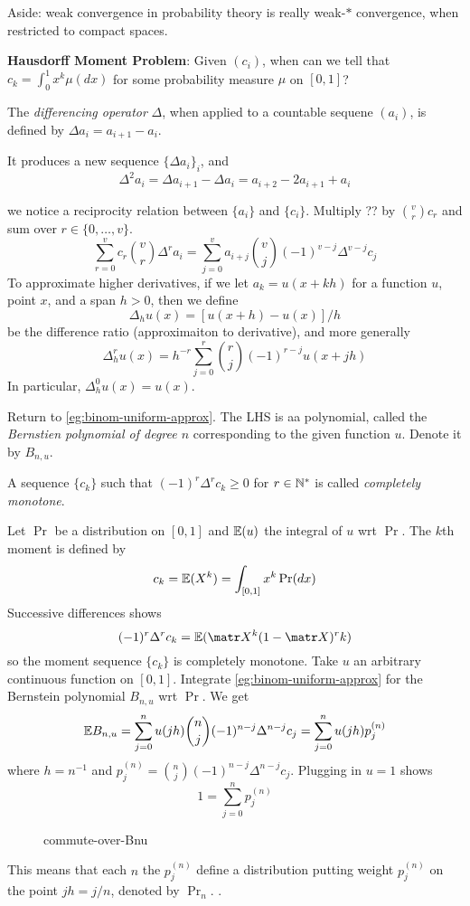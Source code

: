 Aside: weak convergence in probability theory is really weak-$\ast$ convergence,
when restricted to compact spaces.

\textbf{Hausdorff Moment Problem}: Given $(c_i)$, when can we tell that
$c_k = \int_0^1 x^k \mu(dx)$ for some probability measure $\mu$
on $[0,1]$?

\begin{definition}
  The \emph{differencing operator} $\Delta$, when applied to a countable
  sequene $(a_i)$, is defined by $\Delta a_i = a_{i+1} - a_i$.
\end{definition}

It produces a new sequence $\{\Delta a_i\}_i$, and
\[
  \Delta^2 a_i = \Delta a_{i+1} - \Delta a_i
  = a_{i+2} - 2 a_{i+1} + a_i
\]

we notice a reciprocity relation between $\{a_i\}$ and $\{c_i\}$.
Multiply ?? by $\binom{v}{r} c_r$ and sum over $r \in \{0,\ldots,v\}$.
\[
  \sum_{r=0}^v c_r \binom{v}{r} \Delta^r a_i
  = \sum_{j=0}^v a_{i+j} \binom{v}{j} (-1)^{v-j} \Delta^{v-j} c_j
\]
To approximate higher derivatives,
if we let $a_k = u(x+kh)$ for a function $u$, point $x$, and a span $h > 0$,
then we define
\[
  \Delta_h u(x) = [u(x+h) - u(x)] / h
\]
be the difference ratio (approximaiton to derivative), and more generally
\[
  \Delta_h^r u(x) = h^{-r} \sum_{j=0}^r \binom{r}{j} (-1)^{r-j} u(x+jh)
\]
In particular, $\Delta_h^0 u(x) = u(x)$.

Return to \cref{eg:binom-uniform-approx}. The LHS is aa polynomial,
called the \emph{Bernstien polynomial of degree $n$} corresponding
to the given function $u$.
Denote it by $B_{n,u}$.


\begin{definition}
  A sequence $\{c_k\}$ such that $(-1)^r \Delta^r c_k \geq 0$
  for $r \in \mathbb{N}^*$
  is called \emph{completely monotone}.
\end{definition}

Let $\Pr$ be a distribution on $[0,1]$ and $\mathbb{E}(u)$ the
integral of $u$ wrt $\Pr$.  The $k$th moment is defined by
\[
  c_k = \mathbb{E}(X^k) = \int_{[0,1]} x^k \Pr(dx)
\]
Successive differences shows
\[
  (-1)^r \Delta^r c_k = \bE(\mX^k (1 - \mX)^rk)
\]
so the moment sequence $\{c_k\}$ is completely monotone.
Take $u$ an arbitrary continuous function on $[0,1]$.
Integrate \cref{eg:binom-uniform-approx}  for
the Bernstein polynomial $B_{n,u}$ wrt $\Pr$. We get
\[
  \mathbb{E} B_{n,u}
  = \sum_{j=0}^n u(jh) \binom{n}{j} (-1)^{n-j} \Delta^{n-j} c_j
  = \sum_{j=0}^n u(jh) p_j^{(n)}
\]
where $h = n^{-1}$ and $p_j^{(n)} = \binom{n}{j}(-1)^{n-j} \Delta^{n-j} c_j$.
Plugging in $u=1$ shows
\[
  1 = \sum_{j=0}^n p_j^{(n)}
\]
\begin{figure}[ht]
    \centering
    \caption{commute-over-Bnu}
    \label{fig:commute-over-bnu}
\end{figure}
This means that each $n$ the $p_j^{(n)}$ define a distribution
putting weight $p_j^{(n)}$ on the point $jh = j/n$, denoted by $\Pr_n$.
.

